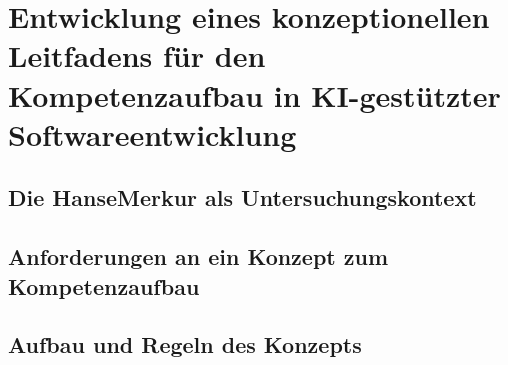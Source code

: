 \section{Entwicklung eines konzeptionellen Leitfadens für den Kompetenzaufbau in KI-gestützter Softwareentwicklung}

\subsection{Die HanseMerkur als Untersuchungskontext}

\subsection{Anforderungen an ein Konzept zum Kompetenzaufbau}

\subsection{Aufbau und Regeln des Konzepts}
